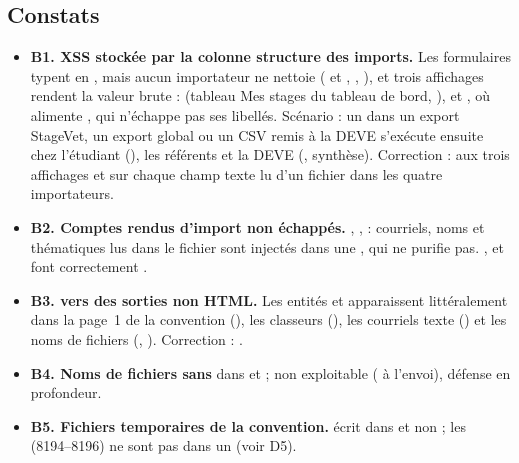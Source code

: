 \documentclass[11pt,a4paper]{article}
\newcommand{\grav}[1]{\textbf{\textcolor{#1}{\textbullet}}}
\newcommand{\maj}{\grav{orange}}
\newcommand{\mineure}{\grav{gray}}
\begin{document}
\subsection{Constats}

\begin{itemize}
  \item[\maj] \textbf{B1. XSS stockée par la colonne \og structure\fg{} des imports.} Les
    formulaires typent  en , mais aucun importateur ne nettoie
    ( et , ,
    ), et trois affichages rendent la valeur brute :
     (tableau \og Mes stages\fg{} du tableau de bord, ),
     et , où
     alimente , qui n'échappe
    pas ses libellés. Scénario : un  dans un export StageVet, un
    export global ou un CSV remis à la DEVE s'exécute ensuite chez l'étudiant (),
    les référents et la DEVE (, synthèse). Correction :  aux trois
    affichages et  sur chaque champ texte lu d'un fichier dans
    les quatre importateurs.
  \item[\mineure] \textbf{B2. Comptes rendus d'import non échappés.} ,
    ,  :
    courriels, noms et thématiques lus dans le fichier sont injectés dans une
    , qui ne purifie pas. ,
     et  font correctement
    .
  \item[\mineure] \textbf{B3.  vers des sorties non HTML.} Les entités
     et  apparaissent littéralement dans la page~1 de la convention
    (), les classeurs (), les courriels
    texte () et les noms de fichiers
    (, ). Correction :
    .
  \item[\mineure] \textbf{B4. Noms de fichiers sans } dans  et
     ; non exploitable ( à l'envoi), défense en profondeur.
  \item[\mineure] \textbf{B5. Fichiers temporaires de la convention.} 
    écrit dans  et non  ; les
     (8194--8196) ne sont pas dans un  (voir D5).
\end{itemize}
\end{document}
